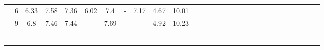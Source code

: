\begin{table}[h]
{\begin{tabular}{l|l|l|l|l|l|l|l|l|l|lllllllllllllllllll}
 & \multicolumn{1}{c|}{6} & \multicolumn{1}{c|}{6.33} & \multicolumn{1}{c|}{7.58} & \multicolumn{1}{c|}{7.36} & \multicolumn{1}{c|}{6.02} & \multicolumn{1}{c|}{7.4} & \multicolumn{1}{c|}{-} & \multicolumn{1}{c|}{7.17} & \multicolumn{1}{c|}{4.67} & \multicolumn{1}{c}{10.01} &  &  &  &  &  &  &  &  &  &  &  &  &  &  &  &  &  &  \\ 
 & \multicolumn{1}{c|}{9} & \multicolumn{1}{c|}{6.8} & \multicolumn{1}{c|}{7.46} & \multicolumn{1}{c|}{7.44} & \multicolumn{1}{c|}{-} & \multicolumn{1}{c|}{7.69} & \multicolumn{1}{c|}{-} & \multicolumn{1}{c|}{-} & \multicolumn{1}{c|}{4.92} & \multicolumn{1}{c}{10.23} &  &  &  &  &  &  &  &  &  &  &  &  &  &  &  &  &  &  \\ 
\cline{1-11}
\multicolumn{1}{l}{} & \multicolumn{1}{l}{} & \multicolumn{1}{l}{} & \multicolumn{1}{l}{} & \multicolumn{1}{l}{} & \multicolumn{1}{l}{} & \multicolumn{1}{l}{} & \multicolumn{1}{l}{} & \multicolumn{1}{l}{} & \multicolumn{1}{l}{} &  &  &  &  &  &  &  &  &  &  &  &  &  &  &  &  &  &  &  \\ 
\multicolumn{1}{l}{} & \multicolumn{1}{l}{} & \multicolumn{1}{l}{} & \multicolumn{1}{l}{} & \multicolumn{1}{l}{} & \multicolumn{1}{l}{} & \multicolumn{1}{l}{} & \multicolumn{1}{l}{} & \multicolumn{1}{l}{} & \multicolumn{1}{l}{} &  &  &  &  &  &  &  &  &  &  &  &  &  &  &  &  &  &  &  \\ 
\multicolumn{1}{l}{} & \multicolumn{1}{l}{} & \multicolumn{1}{l}{} & \multicolumn{1}{l}{} & \multicolumn{1}{l}{} & \multicolumn{1}{l}{} & \multicolumn{1}{l}{} & \multicolumn{1}{l}{} & \multicolumn{1}{l}{} & \multicolumn{1}{l}{} &  &  &  &  &  &  &  &  &  &  &  &  &  &  &  &  &  &  &  \\ 
\multicolumn{1}{l}{} & \multicolumn{1}{l}{} & \multicolumn{1}{l}{} & \multicolumn{1}{l}{} & \multicolumn{1}{l}{} & \multicolumn{1}{l}{} & \multicolumn{1}{l}{} & \multicolumn{1}{l}{} & \multicolumn{1}{l}{} & \multicolumn{1}{l}{} &  &  &  &  &  &  &  &  &  &  &  &  &  &  &  &  &  &  &  \\ 
\multicolumn{1}{l}{} & \multicolumn{1}{l}{} & \multicolumn{1}{l}{} & \multicolumn{1}{l}{} & \multicolumn{1}{l}{} & \multicolumn{1}{l}{} & \multicolumn{1}{l}{} & \multicolumn{1}{l}{} & \multicolumn{1}{l}{} & \multicolumn{1}{l}{} &  &  &  &  &  &  &  &  &  &  &  &  &  &  &  &  &  &  &  \\ 
\multicolumn{1}{l}{} & \multicolumn{1}{l}{} & \multicolumn{1}{l}{} & \multicolumn{1}{l}{} & \multicolumn{1}{l}{} & \multicolumn{1}{l}{} & \multicolumn{1}{l}{} & \multicolumn{1}{l}{} & \multicolumn{1}{l}{} & \multicolumn{1}{l}{} &  &  &  &  &  &  &  &  &  &  &  &  &  &  &  &  &  &  &  \\ 

\end{tabular}}
\end{table}
